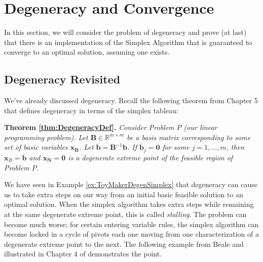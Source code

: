 \chapter{Degeneracy and Convergence}
In this section, we will consider the problem of degeneracy and prove (at last) that there is an implementation of the Simplex Algorithm that is guaranteed to converge to an optimal solution, assuming one exists.

\section{Degeneracy Revisited}
We've already discussed degeneracy. Recall the following theorem from Chapter 5 that defines degeneracy in terms of the simplex tableau:

\vspace*{1em}
\noindent\textbf{Theorem \ref{thm:DegeneracyDef}.} \textit{Consider Problem $P$ (our linear programming problem). Let $\mathbf{B} \in \mathbb{R}^{m\times m}$ be a basis matrix corresponding to some set of basic variables $\mathbf{x_B}$. Let $\overline{\mathbf{b}} = \mathbf{B}^{-1}\mathbf{b}$. If $\overline{\mathbf{b}}_j = \mathbf{0}$ for some $j=1,\dots,m$, then $\mathbf{x}_B = \overline{\mathbf{b}}$ and $\mathbf{x_N} = \mathbf{0}$ is a degenerate extreme point of the feasible region of Problem $P$.}
\vspace*{1em}

We have seen in Example \ref{ex:ToyMakerDegenSimplex} that degeneracy can cause us to take extra steps on our way from an initial basic feasible solution to an optimal solution. When the simplex algorithm takes extra steps while remaining at the same degenerate extreme point, this is called \textit{stalling}. The problem can become much worse; for certain entering variable rules, the simplex algorithm can become locked in a cycle of pivots each one moving from one characterization of a degenerate extreme point to the next. The following example from Beale and illustrated in Chapter 4 of \cite{BJS04} demonstrates the point.

